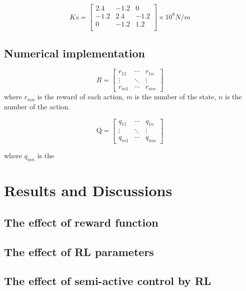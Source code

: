 \begin{equation}       
Ks=\left[                 
  \begin{array}{ccc}   
  2.4 & -1.2 & 0 \\
  -1.2 & 2.4 & -1.2 \\
  0 & -1.2 & 1.2 \\
  \end{array}
\right]     
\times 10^{8} N/m        
\end{equation}

\subsection{Numerical implementation}
\begin{equation}
R=\left[\begin{array}{ccc}
{r_{11}} & {\cdots} & {r_{1 n}} \\
{\vdots} & {\ddots} & {\vdots} \\
{r_{m 1}} & {\cdots} & {r_{m n}}
\end{array}\right]
\end{equation}
where $r_{mn}$ is the reward of each action, $m$ is the number of the state, $n$ is the number of the action. 

\begin{equation}
\mathrm{Q}=\left[\begin{array}{ccc}
{q_{11}} & {\cdots} & {q_{1 n}} \\
{\vdots} & {\ddots} & {\vdots} \\
{q_{m 1}} & {\cdots} & {q_{m n}}
\end{array}\right]
\end{equation}

where $q_{mn}$ is the 



\section{Results and Discussions}
\subsection{The effect of reward function}
\subsection{The effect of RL parameters}
\subsection{The effect of semi-active control by RL}
